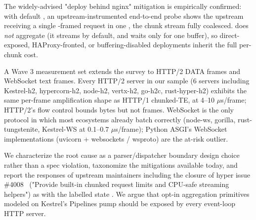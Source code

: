 The widely-advised "deploy behind nginx" mitigation is
empirically confirmed: with default
, an upstream-instrumented
end-to-end probe shows the upstream receiving a single
-framed request in one , the
chunk stream fully coalesced.  does \emph{not}
aggregate (it streams by default, and 
waits only for one buffer), so direct-exposed, HAProxy-fronted, or
buffering-disabled deployments inherit the full per-chunk cost.

A Wave 3 measurement set extends the survey to HTTP/2 DATA frames
and WebSocket text frames. Every HTTP/2 server in our sample
(6 servers including Kestrel-h2, hypercorn-h2, node-h2, vertx-h2,
go-h2c, rust-hyper-h2) exhibits the same per-frame amplification
shape as HTTP/1 chunked-TE, at 4--10 \(\mu\)s/frame; HTTP/2's
flow control bounds bytes but not frames. WebSocket is the only
protocol in which most ecosystems already batch correctly
(node-ws, gorilla, rust-tungstenite, Kestrel-WS at
0.1--0.7 \(\mu\)s/frame); Python ASGI's WebSocket implementations
(uvicorn + websockets / wsproto) are the at-risk outlier.

We characterize the root cause as a parser/dispatcher boundary
design choice rather than a spec violation, taxonomize the
mitigations available today, and report the responses of upstream
maintainers including the closure of hyper issue
\#4008~\cite{hyper_4008} ("Provide built-in chunked request limits
and CPU-safe streaming helpers") as  with the
labelled state . We argue that opt-in
aggregation primitives modeled on Kestrel's Pipelines pump should
be exposed by every event-loop HTTP server.
